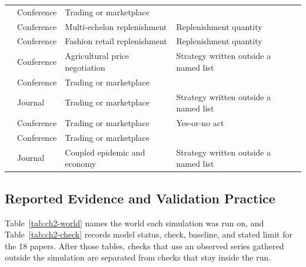 \documentclass{icsthesis}
\begin{document}
\begin{mainmatter}
\begin{longtable}[l]{@{}>{\raggedright\arraybackslash}p{}>{\raggedright\arraybackslash}p{}>{\raggedright\arraybackslash}p{}>{\raggedright\arraybackslash}p{}@{}}
			\citet{VidlerWalsh2024} & Conference & Trading or marketplace &  \\
			\citet{Li2024} & Conference & Multi-echelon replenishment & Replenishment quantity \\
			\citet{Sowmika2026} & Conference & Fashion retail replenishment & Replenishment quantity \\
			\citet{Phan2026} & Conference & Agricultural price negotiation & Strategy written outside a named list \\
			\citet{Sashihara2025} & Conference & Trading or marketplace &  \\
			\citet{Zhou2026} & Journal & Trading or marketplace & Strategy written outside a named list \\
			\citet{VidlerWalsh2025} & Conference & Trading or marketplace & Yes-or-no act \\
			\citet{ParhyGoldwasser2025} & Conference & Trading or marketplace &  \\
			\citet{Wang2026} & Journal & Coupled epidemic and economy & Strategy written outside a named list \\
			\end{longtable}
			\endgroup

			\subsection{Reported Evidence and Validation Practice}

			Table~\ref{tab:ch2-world} names the world each simulation was run on, and Table~\ref{tab:ch2-check} records model status, check, baseline, and stated limit for the 18 papers. After those tables, checks that use an observed series gathered outside the simulation are separated from checks that stay inside the run.


\end{mainmatter}
\end{document}
